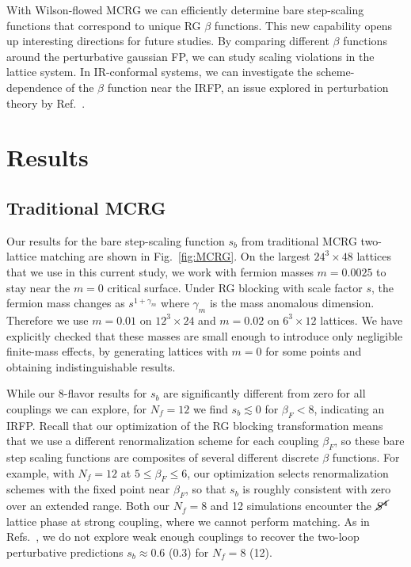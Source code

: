 \documentclass{PoS}
\newcommand{\be}{\ensuremath{\beta} }
\newcommand{\ga}{\ensuremath{\gamma} }
\newcommand{\lsim}{\ensuremath{\lesssim} }
\newcommand{\X}{\ensuremath{\!\times\!} }
\newcommand{\Sb}{\ensuremath{\cancel{S^4}} }
\newcommand{\refcite}[1]{Ref.~\cite{#1}}
\newcommand{\fig}[1]{Fig.~\ref{#1}}
\begin{document}
With Wilson-flowed MCRG we can efficiently determine bare step-scaling functions that correspond to unique RG \be functions.
This new capability opens up interesting directions for future studies.
By comparing different \be functions around the perturbative gaussian FP, we can study scaling violations in the lattice system.
In IR-conformal systems, we can investigate the scheme-dependence of the \be function near the IRFP, an issue explored in perturbation theory by \refcite{Ryttov:2012nt}.



\section{Results} %
\subsection{\label{sec:MCRGresults}Traditional MCRG} %
Our results for the bare step-scaling function $s_b$ from traditional MCRG two-lattice matching are shown in \fig{fig:MCRG}.
On the largest $24^3\X48$ lattices that we use in this current study, we work with fermion masses $m = 0.0025$ to stay near the $m = 0$ critical surface.
Under RG blocking with scale factor $s$, the fermion mass changes as $s^{1 + \ga_m}$ where $\ga_m$ is the mass anomalous dimension.
Therefore we use $m = 0.01$ on $12^3\X24$ and $m = 0.02$ on $6^3\X12$ lattices.
We have explicitly checked that these masses are small enough to introduce only negligible finite-mass effects, by generating lattices with $m = 0$ for some points and obtaining indistinguishable results.

While our 8-flavor results for $s_b$ are significantly different from zero for all couplings we can explore, for $N_f = 12$ we find $s_b \lsim 0$ for $\be_F < 8$, indicating an IRFP.
Recall that our optimization of the RG blocking transformation means that we use a different renormalization scheme for each coupling $\be_F$, so these bare step scaling functions are composites of several different discrete \be functions.
For example, with $N_f = 12$ at $5 \leq \be_F \leq 6$, our optimization selects renormalization schemes with the fixed point near $\be_F$, so that $s_b$ is roughly consistent with zero over an extended range.
Both our $N_f = 8$ and 12 simulations encounter the \Sb lattice phase at strong coupling, where we cannot perform matching.
As in Refs.~\cite{Hasenfratz:2011xn, Hasenfratz:2011np}, we do not explore weak enough couplings to recover the two-loop perturbative predictions $s_b \approx 0.6$ (0.3) for $N_f = 8$ (12).
\end{document}
